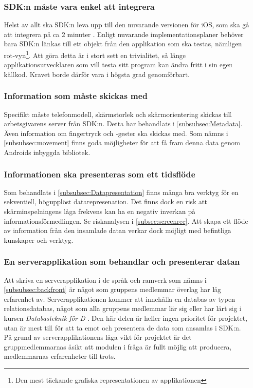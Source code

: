 \subsubsection{SDK:n måste vara enkel att integrera}
Helst av allt ska SDK:n leva upp till den nuvarande versionen för iOS, som ska gå att integrera på ca 2 minuter \parencite{superrec}. Enligt nuvarande implementationsplaner behöver bara SDK:n länkas till ett objekt från den applikation som ska testas, nämligen rot-vyn\footnote{Den mest täckande grafiska representationen av applikationen}. Att göra detta är i stort sett en trivialitet, så länge applikationsutvecklaren som vill testa sitt program kan ändra fritt i sin egen källkod. Kravet borde därför vara i högsta grad genomförbart.

\subsubsection{Information som måste skickas med}
Specifikt måste telefonmodell, skärmstorlek och skärmorientering skickas till arbetsgivarens server från SDK:n. Detta har behandlats i \ref{subsubsec:Metadata}. Även information om fingertryck och -gester ska skickas med. Som nämns i \ref{subsubsec:movement} finns goda möjligheter för att få fram denna data genom Androids inbyggda bibliotek.

\subsubsection{Informationen ska presenteras som ett tidsflöde}
Som behandlats i \ref{subsubsec:Datapresentation} finns många bra verktyg för en sekventiell, högupplöst datarepresenation. Det finns dock en risk att skärminspelningens låga frekvens kan ha en negativ inverkan på informationsförmedlingen. Se riskanalysen i \ref{subsec:screenrec}. Att skapa ett flöde av information från den insamlade datan verkar dock möjligt med befintliga kunskaper och verktyg.

\subsubsection{En serverapplikation som behandlar och presenterar datan}
Att skriva en serverapplikation i de språk och ramverk som nämns i \ref{subsubsec:backfront} är något som gruppens medlemmar överlag har låg erfarenhet av. Serverapplikationen kommer att innehålla en databas av typen relationsdatabas, något som alla gruppens medlemmar lär sig eller har lärt sig i kursen \textit{Databasteknik för D} \parencite{dbas}. Den här delen är heller ingen prioritet för projektet, utan är mest till för att ta emot och presentera de data som ansamlas i SDK:n. På grund av serverapplikationens låga vikt för projektet är det gruppmedlemmarnas åsikt att modulen i fråga är fullt möjlig att producera, medlemmarnas erfarenheter till trots.

